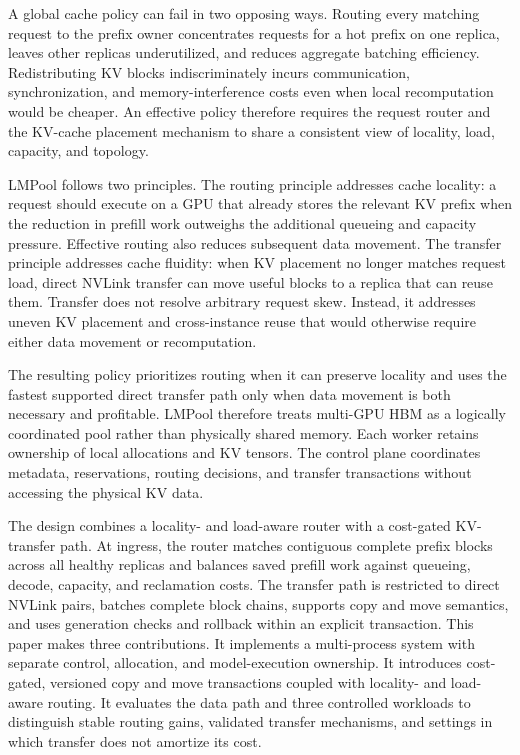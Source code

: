 \documentclass{article}
\newcommand{\sys}{LMPool}
\begin{document}
A global cache policy can fail in two opposing ways. Routing every matching request to the prefix owner concentrates requests for a hot prefix on one replica, leaves other replicas underutilized, and reduces aggregate batching efficiency. Redistributing KV blocks indiscriminately incurs communication, synchronization, and memory-interference costs even when local recomputation would be cheaper. An effective policy therefore requires the request router and the KV-cache placement mechanism to share a consistent view of locality, load, capacity, and topology.

\sys{} follows two principles. The routing principle addresses cache locality: a request should execute on a GPU that already stores the relevant KV prefix when the reduction in prefill work outweighs the additional queueing and capacity pressure. Effective routing also reduces subsequent data movement. The transfer principle addresses cache fluidity: when KV placement no longer matches request load, direct NVLink transfer can move useful blocks to a replica that can reuse them. Transfer does not resolve arbitrary request skew. Instead, it addresses uneven KV placement and cross-instance reuse that would otherwise require either data movement or recomputation.

The resulting policy prioritizes routing when it can preserve locality and uses the fastest supported direct transfer path only when data movement is both necessary and profitable. \sys{} therefore treats multi-GPU HBM as a logically coordinated pool rather than physically shared memory. Each worker retains ownership of local allocations and KV tensors. The control plane coordinates metadata, reservations, routing decisions, and transfer transactions without accessing the physical KV data.

The design combines a locality- and load-aware router with a cost-gated KV-transfer path. At ingress, the router matches contiguous complete prefix blocks across all healthy replicas and balances saved prefill work against queueing, decode, capacity, and reclamation costs. The transfer path is restricted to direct NVLink pairs, batches complete block chains, supports copy and move semantics, and uses generation checks and rollback within an explicit transaction. This paper makes three contributions. It implements a multi-process system with separate control, allocation, and model-execution ownership. It introduces cost-gated, versioned copy and move transactions coupled with locality- and load-aware routing. It evaluates the data path and three controlled workloads to distinguish stable routing gains, validated transfer mechanisms, and settings in which transfer does not amortize its cost.
\end{document}
